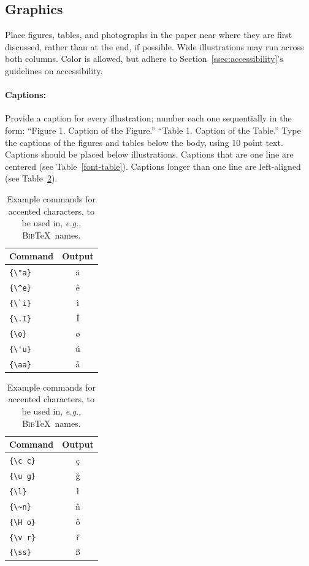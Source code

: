 \documentclass[11pt,a4paper]{article}
\newcommand\BibTeX{B\textsc{ib}\TeX}
\begin{document}
\subsection{Graphics}

Place figures, tables, and photographs in the paper near where they are first discussed, rather than at the end, if possible.
Wide illustrations may run across both columns.
Color is allowed, but adhere to Section~\ref{ssec:accessibility}'s guidelines on accessibility.

\paragraph{Captions:}
Provide a caption for every illustration; number each one sequentially in the form:
``Figure 1. Caption of the Figure.''
``Table 1. Caption of the Table.''
Type the captions of the figures and tables below the body, using 10 point text.
Captions should be placed below illustrations.
Captions that are one line are centered (see Table~\ref{font-table}).
Captions longer than one line are left-aligned (see Table~\ref{tab:accents}).

\begin{table}
  \centering
  \begin{tabular}{lc}
    \hline
    \textbf{Command}        & \textbf{Output} \\
    \hline
    \verb|{\"a}|  & {\"a}           \\
    \verb|{\^e}| & {\^e}           \\
    \verb|{\`i}| & {\`i}           \\
    \verb|{\.I}| & {\.I}           \\
    \verb|{\o}| & {\o}            \\
    \verb|{\'u}| & {\'u}           \\
    \verb|{\aa}| & {\aa}           \\\hline
  \end{tabular}
  \begin{tabular}{lc}
    \hline
    \textbf{Command}        & \textbf{Output} \\
    \hline
    \verb|{\c c}| & {\c c}          \\
    \verb|{\u g}| & {\u g}          \\
    \verb|{\l}| & {\l}            \\
    \verb|{\~n}| & {\~n}           \\
    \verb|{\H o}| & {\H o}          \\
    \verb|{\v r}| & {\v r}          \\
    \verb|{\ss}| & {\ss}           \\
    \hline
  \end{tabular}
  \caption{Example commands for accented characters, to be used in, \emph{e.g.}, \BibTeX\ names.}\label{tab:accents}
\end{table}
\end{document}
